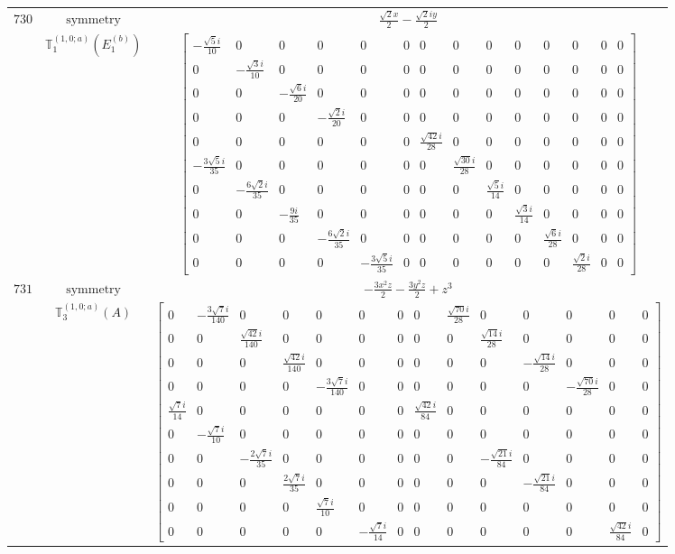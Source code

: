 \documentclass[fleqn,8pt,landscape]{jsarticle}
\begin{document}
\begin{longtable}{ccc}
$ 730 $ & $ \text{symmetry} $ & $ \frac{\sqrt{2} x}{2} - \frac{\sqrt{2} i y}{2} $ \\
$  $ & $ \mathbb{T}_{1}^{(1,0;a)}(E_{1}^{(b)}) $ & $ \begin{bmatrix} - \frac{\sqrt{5} i}{10} & 0 & 0 & 0 & 0 & 0 & 0 & 0 & 0 & 0 & 0 & 0 & 0 & 0 \\ 0 & - \frac{\sqrt{3} i}{10} & 0 & 0 & 0 & 0 & 0 & 0 & 0 & 0 & 0 & 0 & 0 & 0 \\ 0 & 0 & - \frac{\sqrt{6} i}{20} & 0 & 0 & 0 & 0 & 0 & 0 & 0 & 0 & 0 & 0 & 0 \\ 0 & 0 & 0 & - \frac{\sqrt{2} i}{20} & 0 & 0 & 0 & 0 & 0 & 0 & 0 & 0 & 0 & 0 \\ 0 & 0 & 0 & 0 & 0 & 0 & \frac{\sqrt{42} i}{28} & 0 & 0 & 0 & 0 & 0 & 0 & 0 \\ - \frac{3 \sqrt{5} i}{35} & 0 & 0 & 0 & 0 & 0 & 0 & \frac{\sqrt{30} i}{28} & 0 & 0 & 0 & 0 & 0 & 0 \\ 0 & - \frac{6 \sqrt{2} i}{35} & 0 & 0 & 0 & 0 & 0 & 0 & \frac{\sqrt{5} i}{14} & 0 & 0 & 0 & 0 & 0 \\ 0 & 0 & - \frac{9 i}{35} & 0 & 0 & 0 & 0 & 0 & 0 & \frac{\sqrt{3} i}{14} & 0 & 0 & 0 & 0 \\ 0 & 0 & 0 & - \frac{6 \sqrt{2} i}{35} & 0 & 0 & 0 & 0 & 0 & 0 & \frac{\sqrt{6} i}{28} & 0 & 0 & 0 \\ 0 & 0 & 0 & 0 & - \frac{3 \sqrt{5} i}{35} & 0 & 0 & 0 & 0 & 0 & 0 & \frac{\sqrt{2} i}{28} & 0 & 0 \end{bmatrix} $ \\ \hline
$ 731 $ & $ \text{symmetry} $ & $ - \frac{3 x^{2} z}{2} - \frac{3 y^{2} z}{2} + z^{3} $ \\
$  $ & $ \mathbb{T}_{3}^{(1,0;a)}(A) $ & $ \begin{bmatrix} 0 & - \frac{3 \sqrt{7} i}{140} & 0 & 0 & 0 & 0 & 0 & 0 & \frac{\sqrt{70} i}{28} & 0 & 0 & 0 & 0 & 0 \\ 0 & 0 & \frac{\sqrt{42} i}{140} & 0 & 0 & 0 & 0 & 0 & 0 & \frac{\sqrt{14} i}{28} & 0 & 0 & 0 & 0 \\ 0 & 0 & 0 & \frac{\sqrt{42} i}{140} & 0 & 0 & 0 & 0 & 0 & 0 & - \frac{\sqrt{14} i}{28} & 0 & 0 & 0 \\ 0 & 0 & 0 & 0 & - \frac{3 \sqrt{7} i}{140} & 0 & 0 & 0 & 0 & 0 & 0 & - \frac{\sqrt{70} i}{28} & 0 & 0 \\ \frac{\sqrt{7} i}{14} & 0 & 0 & 0 & 0 & 0 & 0 & \frac{\sqrt{42} i}{84} & 0 & 0 & 0 & 0 & 0 & 0 \\ 0 & - \frac{\sqrt{7} i}{10} & 0 & 0 & 0 & 0 & 0 & 0 & 0 & 0 & 0 & 0 & 0 & 0 \\ 0 & 0 & - \frac{2 \sqrt{7} i}{35} & 0 & 0 & 0 & 0 & 0 & 0 & - \frac{\sqrt{21} i}{84} & 0 & 0 & 0 & 0 \\ 0 & 0 & 0 & \frac{2 \sqrt{7} i}{35} & 0 & 0 & 0 & 0 & 0 & 0 & - \frac{\sqrt{21} i}{84} & 0 & 0 & 0 \\ 0 & 0 & 0 & 0 & \frac{\sqrt{7} i}{10} & 0 & 0 & 0 & 0 & 0 & 0 & 0 & 0 & 0 \\ 0 & 0 & 0 & 0 & 0 & - \frac{\sqrt{7} i}{14} & 0 & 0 & 0 & 0 & 0 & 0 & \frac{\sqrt{42} i}{84} & 0 \end{bmatrix} $ \\ \hline

\end{longtable}
\end{document}
